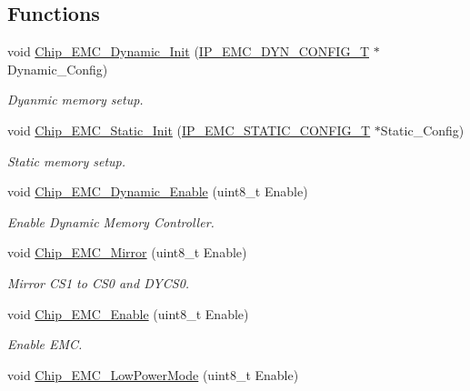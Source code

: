 \subsection*{Functions}
\begin{DoxyCompactItemize}
\item 
void \hyperlink{group___e_m_c__18_x_x__43_x_x_ga8d91e59911be4b9c0f9de5ea24ac54bb}{Chip\+\_\+\+E\+M\+C\+\_\+\+Dynamic\+\_\+\+Init} (\hyperlink{struct_i_p___e_m_c___d_y_n___c_o_n_f_i_g___t}{I\+P\+\_\+\+E\+M\+C\+\_\+\+D\+Y\+N\+\_\+\+C\+O\+N\+F\+I\+G\+\_\+T} $\ast$Dynamic\+\_\+\+Config)
\begin{DoxyCompactList}\small\item\em Dyanmic memory setup. \end{DoxyCompactList}\item 
void \hyperlink{group___e_m_c__18_x_x__43_x_x_ga32ea97990abe55ab52630f80f5354f82}{Chip\+\_\+\+E\+M\+C\+\_\+\+Static\+\_\+\+Init} (\hyperlink{struct_i_p___e_m_c___s_t_a_t_i_c___c_o_n_f_i_g___t}{I\+P\+\_\+\+E\+M\+C\+\_\+\+S\+T\+A\+T\+I\+C\+\_\+\+C\+O\+N\+F\+I\+G\+\_\+T} $\ast$Static\+\_\+\+Config)
\begin{DoxyCompactList}\small\item\em Static memory setup. \end{DoxyCompactList}\item 
void \hyperlink{group___e_m_c__18_x_x__43_x_x_ga321df7291fbf8c56ec0458b50cfa8f33}{Chip\+\_\+\+E\+M\+C\+\_\+\+Dynamic\+\_\+\+Enable} (uint8\+\_\+t Enable)
\begin{DoxyCompactList}\small\item\em Enable Dynamic Memory Controller. \end{DoxyCompactList}\item 
void \hyperlink{group___e_m_c__18_x_x__43_x_x_gaaa94b20dd9a20de6f6cf07c29d21a3f8}{Chip\+\_\+\+E\+M\+C\+\_\+\+Mirror} (uint8\+\_\+t Enable)
\begin{DoxyCompactList}\small\item\em Mirror C\+S1 to C\+S0 and D\+Y\+C\+S0. \end{DoxyCompactList}\item 
void \hyperlink{group___e_m_c__18_x_x__43_x_x_ga4d9286ae1156d93abdabdb3a0e22ba01}{Chip\+\_\+\+E\+M\+C\+\_\+\+Enable} (uint8\+\_\+t Enable)
\begin{DoxyCompactList}\small\item\em Enable E\+MC. \end{DoxyCompactList}\item 
void \hyperlink{group___e_m_c__18_x_x__43_x_x_ga3b8e25a7ed207f79039ea5929dd6a5ab}{Chip\+\_\+\+E\+M\+C\+\_\+\+Low\+Power\+Mode} (uint8\+\_\+t Enable)

\end{DoxyCompactItemize}
